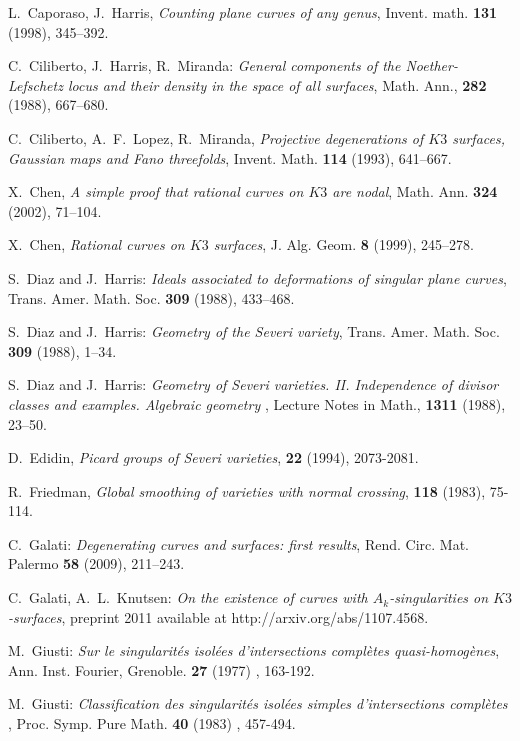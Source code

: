 \documentclass[plain]{amsart}
\begin{document}
\begin{thebibliography}{111}
 L.~Caporaso, J.~Harris, {\it Counting plane curves of any genus}, Invent. math. {\bf 131} (1998), 345--392.

 C.~Ciliberto, J.~Harris, R.~Miranda: {\em General components of the 
Noether-Lefschetz locus and their density in the space of all surfaces}, Math. Ann., {\bf 282} (1988), 667--680.

 C.~Ciliberto, A.~F.~Lopez, R.~Miranda, {\it Projective degenerations of 
$K3$ surfaces, Gaussian maps and Fano threefolds}, Invent. Math. {\bf 114} (1993), 641--667.

 X.~Chen, {\it A simple proof that rational curves on $K3$ are nodal}, 
Math. Ann. {\bf 324} (2002), 71--104.

 X.~Chen, {\it Rational curves on $K3$ surfaces}, J. Alg. Geom. {\bf 8} (1999),
245--278.

 S.~Diaz and J.~Harris: {\em Ideals associated to deformations of singular
plane curves}, Trans. Amer. Math. Soc. {\bf{309}} (1988), 433--468.

 S.~Diaz and J.~Harris: {\em Geometry of the Severi variety}, 
Trans. Amer. Math. Soc. {\bf{309}} (1988), 1--34.

 S.~Diaz and J.~Harris:  {\em  Geometry of Severi varieties. II. 
Independence of divisor classes and examples.  Algebraic geometry },  
Lecture Notes in Math., {\bf 1311} (1988), 23--50. 

 D.~Edidin, {\it Picard groups of Severi varieties},  {\bf 22} (1994),
2073-2081.

 R.~Friedman, {\it Global smoothing of varieties with normal crossing},  {\bf 118} (1983),
75-114.

 C.~Galati: {\em Degenerating curves and surfaces: first results},
Rend. Circ. Mat. Palermo {\bf 58} (2009), 211--243.

 C.~Galati, A.~L.~Knutsen: {\em On the existence of curves with 
$A_k$-singularities on $K3$-surfaces}, preprint 2011 available at http://arxiv.org/abs/1107.4568. 

 M.~Giusti: {\em Sur le singularit\'es isol\'ees d'intersections compl\`etes 
quasi-homog\`enes}, Ann. Inst. Fourier, Grenoble. {\bf 27} (1977) , 163-192.

 M.~Giusti: {\em Classification des singularit\'es isol\'ees simples d'intersections 
compl\`etes }, Proc. Symp. Pure Math. {\bf 40} (1983) , 457-494.
 

\end{thebibliography}
\end{document}
